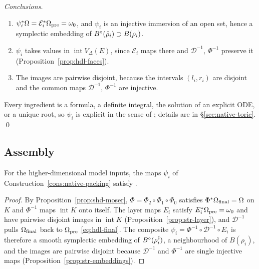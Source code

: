 \emph{Conclusions.}
\begin{enumerate}[label=(\alph*)]
\item $\psi_i^*\Omega=\mathcal E_i^*\Omega_{\rm pre}=\omega_0$, and $\psi_i$ is an injective immersion of an open set, hence a symplectic embedding of $B^{\circ}(\hat\rho_i)\supset B(\rho_i)$.
\item $\psi_i$ takes values in $\operatorname{int}V_\Delta(E)$, since $\mathcal E_i$ maps there and $\mathcal D^{-1}$, $\Phi^{-1}$ preserve it (Proposition~\ref{prop:hdl-faces}).
\item The images are pairwise disjoint, because the intervals $(l_i,r_i)$ are disjoint and the common maps $\mathcal D^{-1}$, $\Phi^{-1}$ are injective.
\end{enumerate}
Every ingredient is a formula, a definite integral, the solution of an explicit ODE, or a unique root, so $\psi_i$ is explicit in the sense of ; details are in \S\ref{sec:native-toric}. \qed

\subsection{Assembly}\label{sec:shd-proof}
\begin{theorem}\label{thm:shd-packing}
For the higher-dimensional model inputs, the maps $\psi_i$ of Construction~\ref{cons:native-packing}
satisfy .
\end{theorem}
\begin{proof}
By Proposition~\ref{prop:shd-moser}, $\Phi=\Phi_2\circ\Phi_1\circ\Phi_0$ satisfies $\Phi^*\Omega_{\rm final}=\Omega$ on $K$ and
$\Phi^{-1}$ maps $\operatorname{int}K$ onto itself. The layer maps $E_i$ satisfy $E_i^*\Omega_{\rm pre}=\omega_0$ and have
pairwise disjoint images in $\operatorname{int}K$ (Proposition~\ref{prop:str-layer}), and $\mathcal D^{-1}$ pulls
$\Omega_{\rm final}$ back to $\Omega_{\rm pre}$ \eqref{eq:hdl-final}. The composite
$\psi_i=\Phi^{-1}\circ\mathcal D^{-1}\circ E_i$ is therefore a smooth symplectic embedding of $B^{\circ}(\rho_i^\sharp)$, a
neighbourhood of $B(\rho_i)$, and the images are pairwise disjoint because $\mathcal D^{-1}$ and $\Phi^{-1}$ are single
injective maps (Proposition~\ref{prop:str-embeddings}).
\end{proof}


